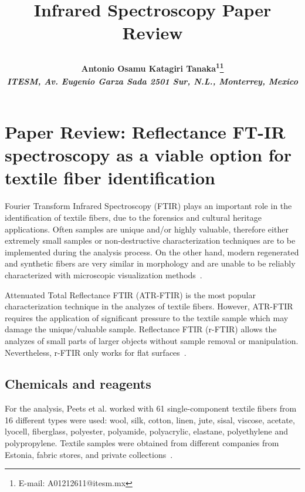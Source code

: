 \documentclass[11pt]{article}
\makeatletter
\def\NormalBaseline{\def\baselinestretch{1.1}}
\def\@shorttitle{\@empty}
\def\shorttitle#1{\gdef\@shorttitle{#1}}
\makeatother
\begin{document}
\renewcommand*\rmdefault{bch}\normalfont\upshape

\shorttitle{Class Assignment}

\date{}  

  
\title{\NormalBaseline\raggedright\bfseries Infrared Spectroscopy {\textemdash} Paper Review}
  \let\origthanks\thanks
\renewcommand\thanks[1]{\begingroup\let\rlap\relax\origthanks{#1}\endgroup}
\author{\hskip2pc\parbox{.95\textwidth}{\bfseries\large Antonio Osamu Katagiri Tanaka\textsuperscript{1}\thanks{E-mail: A01212611@itesm.mx}
      \\[3pt] 
    \normalfont\itshape\NormalBaseline \textsuperscript{} 
    ITESM\unskip, \normalfont\itshape\NormalBaseline Av. Eugenio Garza Sada 2501 Sur\unskip, N.L.\unskip, Monterrey\unskip, Mexico}}
    
    
\maketitle 
\pagestyle{custom}

    
\section{Paper Review: Reflectance FT-IR spectroscopy as a viable option for textile fiber identification\unskip~\protect\cite{693772:16533873}}
Fourier Transform Infrared Spectroscopy (FTIR) plays an important role in the identification of textile fibers, due to the forensics and cultural heritage applications. Often samples are unique and/or highly valuable, therefore either extremely small samples or non-destructive characterization techniques are to be implemented during the analysis process. On the other hand, modern regenerated and synthetic fibers are very similar in morphology and are unable to be reliably characterized with microscopic visualization methods\unskip~\cite{693772:16533873}.

Attenuated Total Reflectance FTIR (ATR-FTIR) is the most popular characterization technique in the analyzes of textile fibers. However, ATR-FTIR requires the application of significant pressure to the textile sample which may damage the unique/valuable sample. Reflectance FTIR (r-FTIR) allows the analyzes of small parts of larger objects without sample removal or manipulation. Nevertheless, r-FTIR only works for flat surfaces\unskip~\cite{693772:16533873}.



\subsection{Chemicals and reagents}For the analysis, Peets et al. worked with 61 single-component textile fibers from 16 different types were used: wool, silk, cotton, linen, jute, sisal, viscose, acetate, lyocell, fiberglass, polyester, polyamide, polyacrylic, elastane, polyethylene and polypropylene. Textile samples were obtained from different companies from Estonia, fabric stores, and private collections\unskip~\cite{693772:16533873}.
\end{document}
